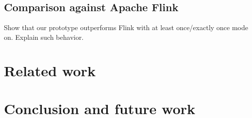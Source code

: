 \documentclass[sigconf]{acmart}
\theoremstyle{remark}
\begin{document}
\subsection{Comparison against Apache Flink}
Show that our prototype outperforms Flink with at least once/exactly once mode on. Explain such behavior.

\section {Related work}

\section {Conclusion and future work}



\end{document}
